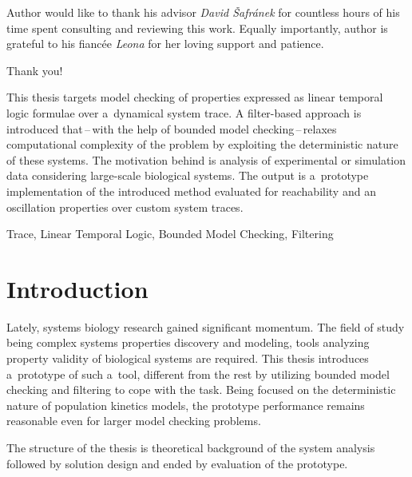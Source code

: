 \documentclass[12pt,twoside,draft]{fithesis}
\begin{document}
\FrontMatter
\ThesisTitlePage


\cleardoublepage
\begin{ThesisDeclaration}
\DeclarationText
\AdvisorName
\end{ThesisDeclaration}

\begin{ThesisThanks}
Author would like to thank his advisor \emph{David \v{S}afr\'{a}nek} for
countless hours of his time spent consulting and reviewing this work.
Equally importantly, author is grateful to his fianc\'{e}e \emph{Leona} for
her loving support and patience.

Thank you!
\end{ThesisThanks}

\begin{ThesisAbstract}
This thesis targets model checking of properties expressed as linear
temporal logic formulae over a~dynamical system trace. A filter-based
approach is introduced that\,--\,with the help of bounded model
checking\,--\,relaxes computational complexity of the problem by
exploiting the deterministic nature of these systems. The motivation
behind is analysis of experimental or simulation data considering
large-scale biological systems.
The output is a~prototype implementation of the introduced method
evaluated for reachability and an oscillation properties over custom
system traces.
\end{ThesisAbstract}

\begin{ThesisKeyWords}
Trace, Linear Temporal Logic, Bounded Model Checking, Filtering
\end{ThesisKeyWords}

\MainMatter
\tableofcontents
\chapter{Introduction}
Lately, systems biology research gained significant momentum. The field of
study being complex systems properties discovery and modeling, tools
analyzing property validity of biological systems are required. This
thesis introduces a~prototype of such a~tool, different from the rest
by utilizing bounded model checking and filtering to cope with the task.
Being focused on the deterministic nature of population kinetics models, the
prototype performance remains reasonable even for larger model checking problems.

The structure of the thesis is theoretical background of the system analysis
followed by solution design and ended by evaluation of the prototype.
\end{document}
